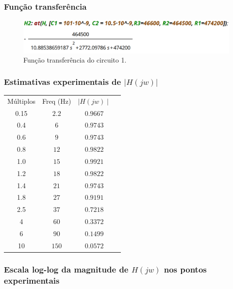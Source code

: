 \documentclass[12pt,twoside, a4paper, twocolumn]{article}
\begin{document}
\subsubsection{Função transferência}


\begin{figure}[h]
    \centering
    \includegraphics[width=1\columnwidth]{images/H2valoresreais.png}
    \caption{Função transferência do circuito 1.}
\end{figure}


\subsubsection{Estimativas experimentais de $ | H(jw) | $}


\begin{center}
    \begin{tabular}{ |c|c|c|c| }
        \hline
        Múltiplos & Freq (Hz) & $\mid H(jw) \mid$ \\
        0.15      & $2.2$     & $0.9667$          \\
        0.4       & $6$       & $0.9743$          \\
        0.6       & $9$       & $0.9743$          \\
        0.8       & $12$      & $0.9822$          \\
        1.0       & $15$      & $0.9921$          \\
        1.2       & $18$      & $0.9822$          \\
        1.4       & $21$      & $0.9743$          \\
        1.8       & $27$      & $0.9191$          \\
        2.5       & $37$      & $0.7218$          \\
        4         & $60$      & $0.3372$          \\
        6         & $90$      & $0.1499$          \\
        10        & $150$     & $0.0572$          \\
        \hline
    \end{tabular}
\end{center}
\pagebreak


\subsubsection*{Escala log-log da magnitude de $H(jw)$ nos pontos experimentais}
\end{document}

